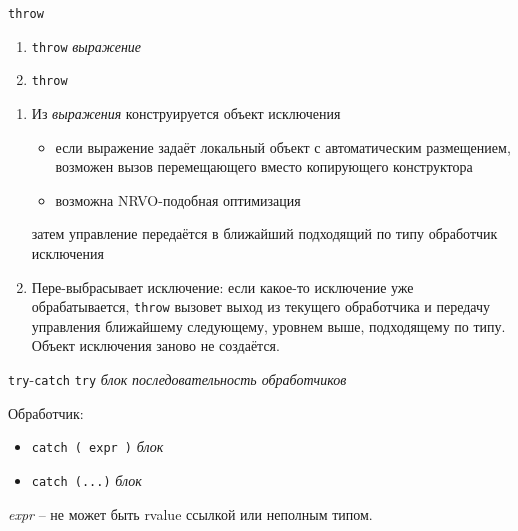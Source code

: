 \documentclass[unknownkeysallowed,xcolor=table]{beamer}
\begin{document}
\begin{frame}{\lstinline{throw}}
  \begin{enumerate}
    \item \lstinline{throw} \emph{выражение}
    \item \lstinline{throw}
  \end{enumerate}

  \vspace{1em}

  \begin{enumerate}
    \item Из \emph{выражения} конструируется объект исключения
      \begin{itemize}
        \item если выражение задаёт локальный объект с автоматическим размещением, возможен вызов перемещающего вместо копирующего конструктора
        \item возможна NRVO-подобная оптимизация
      \end{itemize}
      затем управление передаётся в ближайший подходящий по типу обработчик исключения
    \item Пере-выбрасывает исключение: если какое-то исключение уже обрабатывается, \lstinline{throw} вызовет выход из текущего обработчика и передачу управления
      ближайшему следующему, уровнем выше, подходящему по типу. Объект исключения заново не создаётся.
  \end{enumerate}
\end{frame}

\begin{frame}[fragile]{\lstinline{try}-\lstinline{catch}}
  \lstinline{try} \emph{блок} \emph{последовательность обработчиков}

  \vspace{1em}

  Обработчик:
  \begin{itemize}
    \item \lstinline{catch ( expr )} \emph{блок}
    \item \lstinline{catch (...)} \emph{блок}
  \end{itemize}

  \vspace{1em}

  \emph{expr} -- не может быть rvalue ссылкой или неполным типом.
\end{frame}
\end{document}
